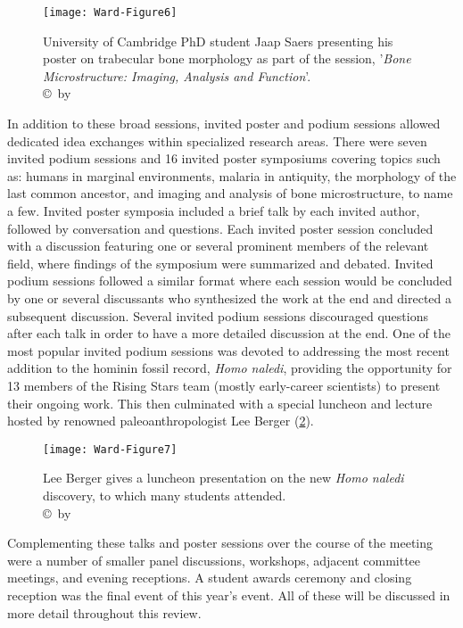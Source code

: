 	\begin{figure}[!htb] %
		\centering
		\texttt{[image: Ward-Figure6]}
		\caption{University of Cambridge PhD student Jaap Saers presenting his poster on trabecular bone morphology as part of the session, '\emph{Bone Microstructure: Imaging, Analysis and Function}'.
				{\normalfont\scriptsize \\ \copyright\ by \authortwo}}
		\label{fig:Ward-Figure6}
	\end{figure}

In addition to these broad sessions, 
invited poster and podium sessions allowed dedicated idea exchanges within specialized research areas. 
There were seven invited podium sessions and 16 invited poster symposiums covering topics such as: humans in marginal environments, 
malaria in antiquity, the morphology of the last common ancestor, and imaging and analysis of bone microstructure, to name a few. 
Invited poster symposia included a brief talk by each invited author, followed by conversation and questions. 
Each invited poster session concluded with a discussion featuring one or several prominent members of the relevant field,
where findings of the symposium were summarized and debated. 
Invited podium sessions followed a similar format where each session would be concluded by one or several discussants who synthesized
the work at the end and directed a subsequent discussion. 
Several invited podium sessions discouraged questions after each talk in order to have a more detailed discussion at the end.
One of the most popular invited podium sessions was devoted to addressing the most recent addition to the hominin fossil record,
\emph{Homo naledi}, providing the opportunity for 13 members of the Rising Stars team (mostly early-career scientists)
to present their ongoing work. 
This then culminated with a special luncheon and lecture hosted by renowned paleoanthropologist Lee Berger (\cref{fig:Ward-Figure7}).

	\begin{figure}[!htb] %
		\centering
		\texttt{[image: Ward-Figure7]}
		\caption{Lee Berger gives a luncheon presentation on the new \emph{Homo naledi} discovery, to which many students attended.
		{\normalfont\scriptsize \\ \copyright\ by \authortwo}}
		\label{fig:Ward-Figure7}
	\end{figure}

Complementing these talks and poster sessions over the course of the meeting were a number of smaller panel discussions,
workshops, adjacent committee meetings, and evening receptions. 
A student awards ceremony and closing reception was the final event of this year’s event.  
All of these will be discussed in more detail throughout this review.

